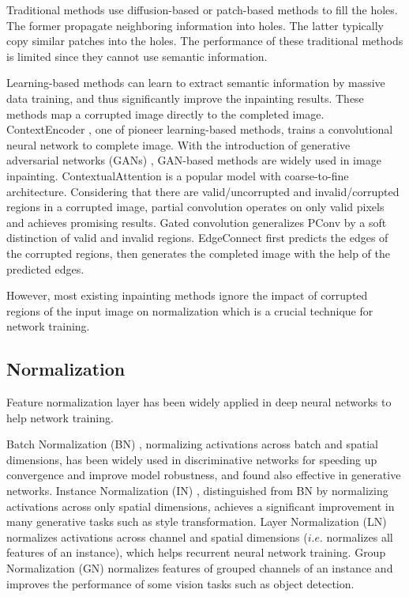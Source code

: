 \documentclass[letterpaper]{article} %
\begin{document}
Traditional methods use diffusion-based \cite{bertalmio2000image,ballester2001filling,esedoglu2002digital,bertalmio2003simultaneous} or patch-based \cite{drori2003fragment,barnes2009patchmatch,xu2010image,darabi2012image} methods to fill the holes. The former propagate neighboring information into holes. The latter typically copy similar patches into the holes. The performance of these traditional methods is limited since they cannot use semantic information.

Learning-based methods can learn to extract semantic information by massive data training, and thus significantly improve the inpainting results. These methods map a corrupted image directly to the completed image. ContextEncoder \cite{pathak2016context}, one of pioneer learning-based methods, trains a convolutional neural network to complete image. With the introduction of generative adversarial networks (GANs) \cite{goodfellow2014generative}, GAN-based methods \cite{yeh2017semantic,iizuka2017globally,yu2018generative,xiong2019foreground,nazeri2019edgeconnect} are widely used in image inpainting. ContextualAttention \cite{yu2018generative} is a popular model with coarse-to-fine architecture. Considering that there are valid/uncorrupted and invalid/corrupted regions in a corrupted image, partial convolution \cite{liu2018image} operates on only valid pixels and achieves promising results. Gated convolution \cite{yu2019free} generalizes PConv by a soft distinction of valid and invalid regions. EdgeConnect \cite{nazeri2019edgeconnect} first predicts the edges of the corrupted regions, then generates the completed image with the help of the predicted edges.

However, most existing inpainting methods ignore the impact of corrupted regions of the input image on normalization which is a crucial technique for network training.


\subsection{Normalization}
Feature normalization layer has been widely applied in deep neural networks to help network training.

Batch Normalization (BN) \cite{ioffe2015batch}, normalizing activations across batch and spatial dimensions, has been widely used in discriminative networks for speeding up convergence and improve model robustness, and found also effective in generative networks. Instance Normalization (IN) \cite{ulyanov2016instance}, distinguished from BN by normalizing activations across only spatial dimensions, achieves a significant improvement in many generative tasks such as style transformation. Layer Normalization (LN) \cite{ba2016layer} normalizes activations across channel and spatial dimensions ($i.e.$ normalizes all features of an instance), which helps recurrent neural network training. Group Normalization (GN) \cite{wu2018group} normalizes features of grouped channels of an instance and improves the performance of some vision tasks such as object detection.
\end{document}
